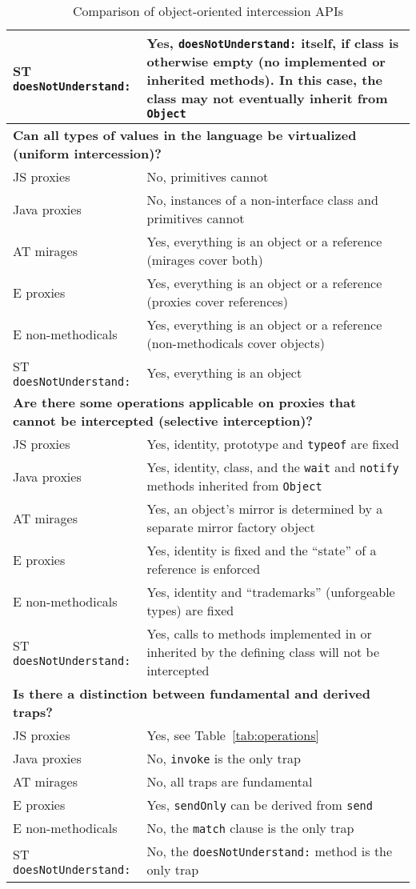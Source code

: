 \documentclass{acm_proc_article-sp}
\begin{document}
\begin{table*}
\begin{tabular}{|p{}|p{}|}
    ST \texttt{doesNotUnderstand:}  & Yes, \texttt{doesNotUnderstand:} itself, if class is otherwise empty (no implemented or inherited methods). In this case, the class may not eventually inherit from \texttt{Object}\\
    \hline
    \multicolumn{2}{|l|}{\textbf{Can all types of values in the language be virtualized (uniform intercession)?}}\\
    \hline
    JS proxies        & No, primitives cannot\\
    Java proxies      & No, instances of a non-interface class and primitives cannot\\
    AT mirages        & Yes, everything is an object or a reference (mirages cover both)\\
    E proxies         & Yes, everything is an object or a reference (proxies cover references)\\
    E non-methodicals & Yes, everything is an object or a reference (non-methodicals cover objects)\\
    ST \texttt{doesNotUnderstand:}  & Yes, everything is an object\\
    \hline
    \multicolumn{2}{|l|}{\textbf{Are there some operations applicable on proxies that cannot be intercepted (selective interception)?}}\\
    \hline
    JS proxies        & Yes, identity, prototype and \texttt{typeof} are fixed\\
    Java proxies      & Yes, identity, class, and the \texttt{wait} and \texttt{notify} methods inherited from \texttt{Object}\\
    AT mirages        & Yes, an object's mirror is determined by a separate mirror factory object\\
    E proxies         & Yes, identity is fixed and the ``state'' of a reference is enforced\\
    E non-methodicals & Yes, identity and ``trademarks'' (unforgeable types) are fixed\\
    ST \texttt{doesNotUnderstand:}  & Yes, calls to methods implemented in or inherited by the defining class will not be intercepted\\
    \hline
    \multicolumn{2}{|l|}{\textbf{Is there a distinction between fundamental and derived traps?}}\\
    \hline
    JS proxies        & Yes, see Table~\ref{tab:operations}\\
    Java proxies      & No, \texttt{invoke} is the only trap\\
    AT mirages        & No, all traps are fundamental\\
    E proxies         & Yes, \texttt{sendOnly} can be derived from \texttt{send}\\
    E non-methodicals & No, the \texttt{match} clause is the only trap\\
    ST \texttt{doesNotUnderstand:}  & No, the \texttt{doesNotUnderstand:} method is the only trap\\
    \hline
  \end{tabular}
  \caption{Comparison of object-oriented intercession APIs}
  \label{tab:related_work}
\end{table*}
\end{document}
